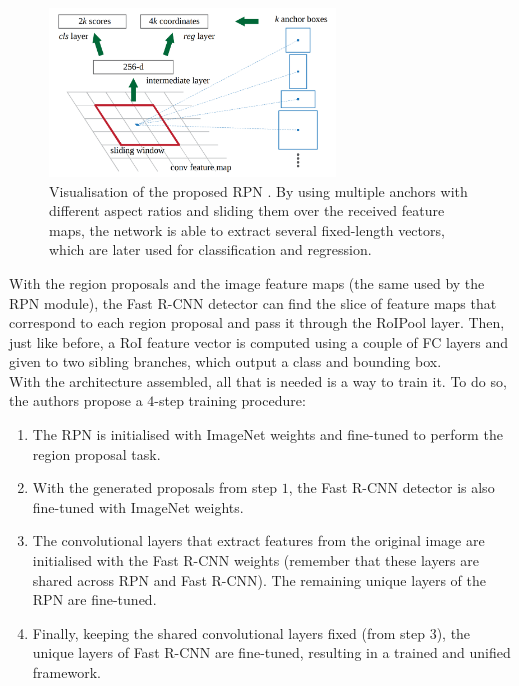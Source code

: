\begin{figure}[h]
\centering
\includegraphics[width=215pt]{figures/figure_8.pdf}
\caption{Visualisation of the proposed \ac{RPN} \cite{faster_r_cnn}. By using multiple anchors with different aspect ratios and sliding them over the received feature maps, the network is able to extract several fixed-length vectors, which are later used for classification and regression.}
\label{fig:faster_r_cnn_rpn}
\end{figure}

With the region proposals and the image feature maps (the same used by the \ac{RPN} module), the Fast \ac{R-CNN} detector can find the slice of feature maps that correspond to each region proposal and pass it through the \ac{RoIPool} layer. Then, just like before, a \ac{RoI} feature vector is computed using a couple of \ac{FC} layers and given to two sibling branches, which output a class and bounding box. \\

With the architecture assembled, all that is needed is a way to train it. To do so, the authors propose a $4$-step training procedure: 

\begin{enumerate}
    \item The \ac{RPN} is initialised with ImageNet weights and fine-tuned to perform the region proposal task.
    \item With the generated proposals from step $1$, the Fast \ac{R-CNN} detector is also fine-tuned with ImageNet weights.
    \item The convolutional layers that extract features from the original image are initialised with the Fast \ac{R-CNN} weights (remember that these layers are shared across \ac{RPN} and Fast \ac{R-CNN}). The remaining unique layers of the \ac{RPN} are fine-tuned.
    \item Finally, keeping the shared convolutional layers fixed (from step $3$), the unique layers of Fast \ac{R-CNN} are fine-tuned, resulting in a trained and unified framework.
\end{enumerate}

